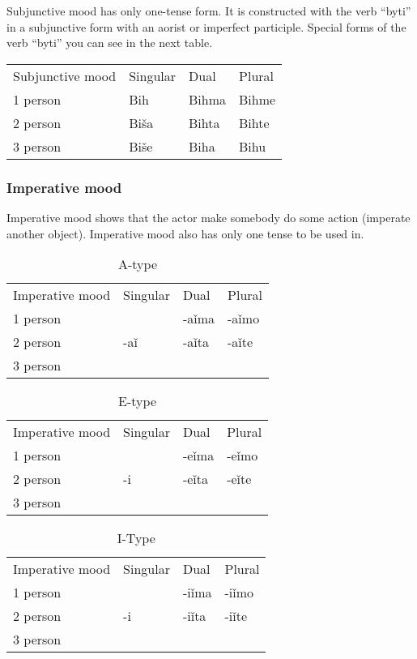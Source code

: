 Subjunctive mood has only one-tense form. It is constructed with the verb “byti” in a subjunctive form with an aorist or imperfect participle. Special forms of the verb “byti” you can see in the next table.

\begin{table}[!htb]
	\begin{tabular}{llll}
		Subjunctive mood & Singular & Dual & Plural \\
		1 person & Bih & Bihma & Bihme \\
		2 person & Biša & Bihta & Bihte \\
		3 person & Biše & Biha & Bihu
	\end{tabular}
\end{table}

\subsubsection{Imperative mood}

Imperative mood shows that the actor make somebody do some action (imperate another object). Imperative mood also has only one tense to be used in. 

\begin{table}[!htb]
	\caption{A-type}
	\begin{tabular}{llll}
		Imperative mood & Singular & Dual & Plural \\
		1 person &  & -aǐma & -aǐmo \\
		2 person & -aǐ & -aǐta & -aǐte \\
		3 person &  &  & 
	\end{tabular}
\end{table}



\begin{table}[!htb]
	\caption{E-type}
	\begin{tabular}{llll}
		Imperative mood & Singular & Dual & Plural \\
		1 person &  & -eǐma & -eǐmo \\
		2 person & -i & -eǐta & -eǐte \\
		3 person &  &  & 
	\end{tabular}
\end{table}



\begin{table}[!htb]
	\caption{I-Type}
	\begin{tabular}{llll}
		Imperative mood & Singular & Dual & Plural \\
		1 person &  & -iǐma & -iǐmo \\
		2 person & -i & -iǐta & -iǐte \\
		3 person &  &  & 
	\end{tabular}
\end{table}

